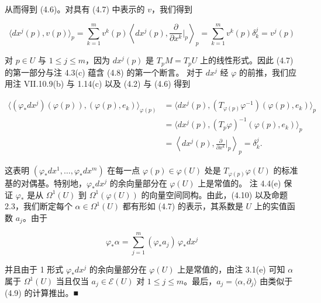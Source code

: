 \begin{remark}
\begin{items}
从而得到 (4.6)。对具有 (4.7) 中表示的 $ v $，我们得到

\begin{equation}
\langle dx^{j}(p),v(p)\rangle_{p} = \sum_{k=1}^{m}v^{k}(p)\left\langle dx^{j}(p),\frac{\partial}{\partial x^{k}}\Big|_{p}\right\rangle_{p} = \sum_{k=1}^{m}v^{k}(p)\delta_{k}^{j} = v^{j}(p)\tag{4.9}
\end{equation}

对 $ p\in U $ 与 $ 1\le j\le m $，因为 $ dx^{j}(p) $ 是 $ T_{p}M = T_{p}U $ 上的线性形式。因此 (4.7) 的第一部分与注 4.3(c) 蕴含 (4.8) 的第一个断言。
对于 $ dx^{j} $ 经 $ \varphi $ 的前推，我们应用注 VII.10.9(b) 与 1.14(c) 以及 (4.2) 与 (4.6) 得到

\begin{equation}
\begin{aligned}
\langle(\varphi_{\ast}dx^{j})(\varphi(p)),(\varphi(p),e_{k})\rangle_{\varphi(p)} &= \langle dx^{j}(p),(T_{\varphi(p)}\varphi^{-1})(\varphi(p),e_{k})\rangle_{p}\\ &= \langle dx^{j}(p),(T_{p}\varphi)^{-1}(\varphi(p),e_{k})\rangle_{p}\\ &= \left\langle dx^{j}(p),\frac{\partial}{\partial x^{k}}\Big|_{p}\right\rangle_{p} = \delta_{k}^{j}.
\end{aligned}\tag{4.10}
\end{equation}

这表明 $ (\varphi_{\ast}dx^{1},\ldots,\varphi_{\ast}dx^{m}) $ 在每一点 $ \varphi(p)\in\varphi(U) $ 处是 $ T_{\varphi(p)}\varphi(U) $ 的标准基的对偶基。特别地，$ \varphi_{\ast}dx^{j} $ 的余向量部分在 $ \varphi(U) $ 上是常值的。
注 4.4(e) 保证 $ \varphi_{\ast} $ 是从 $ \Omega^{1}(U) $ 到 $ \Omega^{1}(\varphi(U)) $ 的向量空间同构。由此，(4.10) 以及命题 2.3，我们断定每个 $ \alpha\in\Omega^{1}(U) $ 都有形如 (4.7) 的表示，其系数是 $ U $ 上的实值函数 $ a_{j} $。由于

\begin{equation}
\varphi_{\ast}\alpha = \sum_{j=1}^{m}(\varphi_{\ast}a_{j})\,\varphi_{\ast}dx^{j}\tag{4.11}
\end{equation}

并且由于 1 形式 $ \varphi_{\ast}dx^{j} $ 的余向量部分在 $ \varphi(U) $ 上是常值的，由注 3.1(e) 可知 $ \alpha $ 属于 $ \Omega^{1}(U) $ 当且仅当 $ a_{j}\in\mathcal{E}(U) $ 对 $ 1\le j\le m $。最后，$ a_{j} = \langle\alpha,\partial_{j}\rangle $ 由类似于 (4.9) 的计算推出。\nobreak\hspace{0.35em}■

\item


\end{items}
\end{remark}
